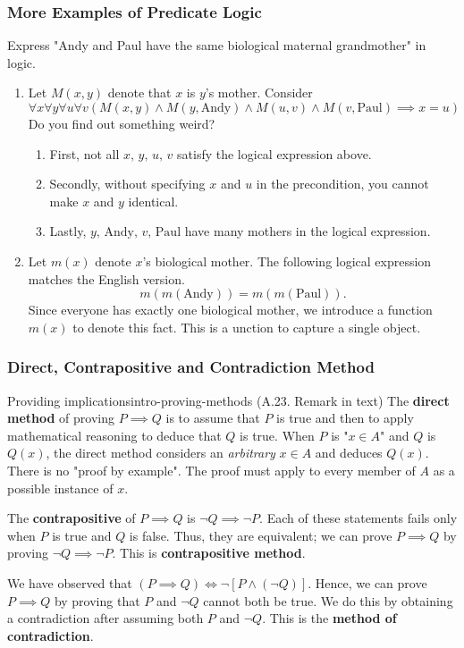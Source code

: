 \documentclass[../src/handouts/main.tex]{subfiles}
\begin{document}
\subsubsection{More Examples of Predicate Logic}

Express "Andy and Paul have the same biological maternal grandmother" in logic.
\begin{enumerate}
  \item Let $M(x, y)$ denote that $x$ is $y$'s mother. Consider
        $$
          \forall x \forall y \forall u \forall v(M(x, y) \land M(y, \text{Andy}) \land M(u, v) \land M(v, \text{Paul}) \implies x = u)
        $$
        Do you find out something weird?
        \begin{enumerate}
          \item First, not all $x,\, y,\, u,\, v$ satisfy the logical expression above.
          \item Secondly, without specifying $x$ and $u$ in the precondition, you cannot make $x$ and $y$ identical.
          \item Lastly, $y,\, \text{Andy},\, v,\, \text{Paul}$ have many mothers in the logical expression.
        \end{enumerate}
  \item Let $m(x)$ denote $x$'s biological mother. The following logical expression matches the English version.
        $$
          m(m(\text{Andy}))=m(m(\text{Paul})).
        $$
        Since everyone has exactly one biological mother, we introduce a function $m(x)$ to denote this fact. This is a unction to capture a single object.
\end{enumerate}

\subsubsection{Direct, Contrapositive and Contradiction Method}

\begin{remark}{Providing implications}{intro-proving-methods}
  (A.23. Remark in text)
  The \textbf{direct method} of proving $P \implies Q$ is to assume that $P$ is true and then to apply mathematical reasoning to deduce that $Q$ is true.
  When $P$ is "$x \in A$" and $Q$ is $Q(x)$, the direct method considers an \textit{arbitrary} $x \in A$ and deduces $Q(x)$.
  There is no "proof by example".
  The proof must apply to every member of $A$ as a possible instance of $x$.

  The \textbf{contrapositive} of $P \implies Q$ is $\neg Q \implies \neg P$. Each of these statements fails only when $P$ is true and $Q$ is false. Thus, they are equivalent; we can prove $P \implies Q$ by proving $\neg Q \implies \neg P$. This is \textbf{contrapositive method}.

  We have observed that $(P \implies Q) \iff \neg \left[ P \land (\neg Q) \right]$.
  Hence, we can prove $P \implies Q$ by proving that $P$ and $\neg Q$ cannot both be true.
  We do this by obtaining a contradiction after assuming both $P$ and $\neg Q$.
  This is the \textbf{method of contradiction}.
\end{remark}
\end{document}
